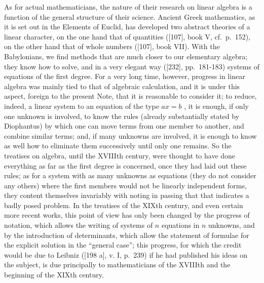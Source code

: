 As for actual mathematicians, the nature of their research on linear algebra is a function of the general structure of their science. Ancient Greek mathematics, as it is set out in the Elements of Euclid, has developed two abstract theories of a linear character, on the one hand that of quantities ({[}107{]}, book V, cf.~p.~152), on the other hand that of whole numbers ({[}107{]}, book VII). With the Babylonians, we find methods that are much closer to our elementary algebra; they know how to solve, and in a very elegant way ({[}232{]}, pp.~181-183) systems of equations of the first degree. For a very long time, however, progress in linear algebra was mainly tied to that of algebraic calculation, and it is under this aspect, foreign to the present Note, that it is reasonable to consider it; to reduce, indeed, a linear system to an equation of the type \(ax = b\) , it is enough, if only one unknown is involved, to know the rules (already substantially stated by Diophantus) by which one can move terms from one member to another, and combine similar terms; and, if many unknowns are involved, it is enough to know as well how to eliminate them successively until only one remains. So the treatises on algebra, until the XVIIIth century, were thought to have done everything as far as the first degree is concerned, once they had laid out these rules; as for a system with as many unknowns as equations (they do not consider any others) where the first members would not be linearly independent forms, they content themselves invariably with noting in passing that that indicates a badly posed problem. In the treatises of the XIXth century, and even certain more recent works, this point of view has only been changed by the progress of notation, which allows the writing of systems of \(n\) equations in \(n\) unknowns, and by the introduction of determinants, which allow the statement of formulae for the explicit solution in the ``general case''; this progress, for which the credit would be due to Leibniz ({[}198 a{]}, v. I, p.~239) if he had published his ideas on the subject, is due principally to mathematicians of the XVIIIth and the beginning of the XIXth century.

